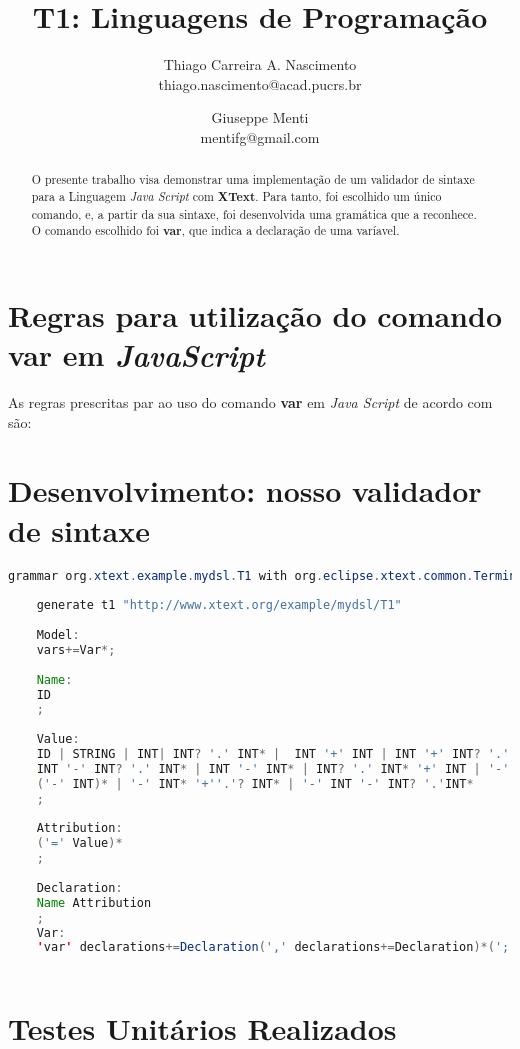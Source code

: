 \documentclass[]{article}
\title{T1: Linguagens de Programação}
\author{Thiago Carreira A. Nascimento \\{thiago.nascimento@acad.pucrs.br} \and Giuseppe Menti \\{mentifg@gmail.com}}
\begin{document}
\maketitle

\begin{abstract}
	
O presente trabalho visa demonstrar uma implementação de um validador de sintaxe para a Linguagem \textit{Java Script} com \textbf{XText}\cite{efftinge_spoenemann}. Para tanto, foi escolhido um único comando, e, a partir da sua sintaxe, foi desenvolvida uma gramática que a reconhece. O comando escolhido foi \textbf{var}\cite{waldron_2018}, que indica a declaração de uma varíavel.

\end{abstract}

\section{Regras para utilização do comando \textbf{var} em \textit{JavaScript}}

As regras prescritas par ao uso do comando \textbf{var} em \textit{Java Script} de acordo com \cite{} são:
\section{Desenvolvimento: nosso validador de sintaxe}

\begin{lstlisting}[language = java]
	grammar org.xtext.example.mydsl.T1 with org.eclipse.xtext.common.Terminals
	
	generate t1 "http://www.xtext.org/example/mydsl/T1"
	
	Model:
	vars+=Var*;
	
	Name:
	ID
	;
	
	Value:
	ID | STRING | INT| INT? '.' INT* |  INT '+' INT | INT '+' INT? '.' INT* | INT '+' INT* | INT '-' INT |
	INT '-' INT? '.' INT* | INT '-' INT* | INT? '.' INT* '+' INT | '-' INT* | 
	('-' INT)* | '-' INT* '+''.'? INT* | '-' INT '-' INT? '.'INT*
	;
	
	Attribution:
	('=' Value)*
	;
	
	Declaration:
	Name Attribution
	;
	Var:
	'var' declarations+=Declaration(',' declarations+=Declaration)*(';')?;
	
	\end{lstlisting}

\section{Testes Unitários Realizados}
\end{document}
